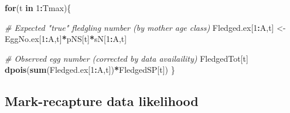 \documentclass[
]{book}
\newenvironment{Shaded}{\begin{snugshade}}{\end{snugshade}}
\newcommand{\CommentTok}[1]{\textcolor[rgb]{0.56,0.35,0.01}{\textit{#1}}}
\newcommand{\ControlFlowTok}[1]{\textcolor[rgb]{0.13,0.29,0.53}{\textbf{#1}}}
\newcommand{\DecValTok}[1]{\textcolor[rgb]{0.00,0.00,0.81}{#1}}
\newcommand{\KeywordTok}[1]{\textcolor[rgb]{0.13,0.29,0.53}{\textbf{#1}}}
\newcommand{\NormalTok}[1]{#1}
\newcommand{\OperatorTok}[1]{\textcolor[rgb]{0.81,0.36,0.00}{\textbf{#1}}}
\newcommand{\StringTok}[1]{\textcolor[rgb]{0.31,0.60,0.02}{#1}}
\begin{document}
\begin{Shaded}
\begin{Highlighting}[]
\ControlFlowTok{for}\NormalTok{(t }\ControlFlowTok{in} \DecValTok{1}\OperatorTok{:}\NormalTok{Tmax)\{}

    \CommentTok{# Expected "true" fledgling number (by mother age class)}
\NormalTok{    Fledged.ex[}\DecValTok{1}\OperatorTok{:}\NormalTok{A,t] <-}\StringTok{ }\NormalTok{EggNo.ex[}\DecValTok{1}\OperatorTok{:}\NormalTok{A,t]}\OperatorTok{*}\NormalTok{pNS[t]}\OperatorTok{*}\NormalTok{sN[}\DecValTok{1}\OperatorTok{:}\NormalTok{A,t]}

    \CommentTok{# Observed egg number (corrected by data availaility)}
\NormalTok{    FledgedTot[t] }\OperatorTok{~}\StringTok{ }\KeywordTok{dpois}\NormalTok{(}\KeywordTok{sum}\NormalTok{(Fledged.ex[}\DecValTok{1}\OperatorTok{:}\NormalTok{A,t])}\OperatorTok{*}\NormalTok{FledgedSP[t])}
\NormalTok{\}}
\end{Highlighting}
\end{Shaded}

\hypertarget{mark-recapture-data-likelihood}{%
\subsection{Mark-recapture data likelihood}\label{mark-recapture-data-likelihood}}
\end{document}
